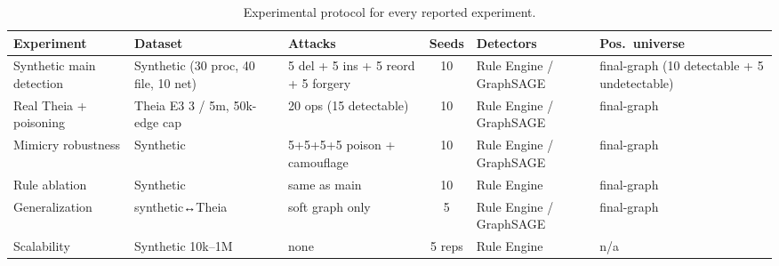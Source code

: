 \begin{table}[t]
\centering
\small
\caption{Experimental protocol for every reported experiment.}
\label{tab:protocol}
\begin{tabular}{p{2.6cm}p{2.6cm}p{3.2cm}cp{2.6cm}p{2.4cm}}
\toprule
Experiment & Dataset & Attacks & Seeds & Detectors & Pos.\ universe \\
\midrule
Synthetic main detection & Synthetic (30 proc, 40 file, 10 net) & 5 del + 5 ins + 5 reord + 5 forgery & 10 & Rule Engine / GraphSAGE & final-graph (10 detectable + 5 undetectable) \\
Real Theia + poisoning & Theia E3 3 / 5m, 50k-edge cap & 20 ops (15 detectable) & 10 & Rule Engine / GraphSAGE & final-graph \\
Mimicry robustness & Synthetic & 5+5+5+5 poison + camouflage & 10 & Rule Engine / GraphSAGE & final-graph \\
Rule ablation & Synthetic & same as main & 10 & Rule Engine & final-graph \\
Generalization & synthetic↔Theia & soft graph only & 5 & Rule Engine / GraphSAGE & final-graph \\
Scalability & Synthetic 10k–1M & none & 5 reps & Rule Engine & n/a \\
\bottomrule
\end{tabular}
\end{table}
